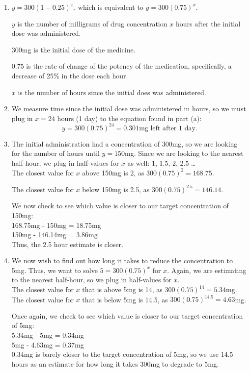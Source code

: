 \documentclass{ximera}
\begin{document}
\begin{explanation}
\begin{enumerate}
\item $y = 300(1-0.25)^x$, which is equivalent to $y = 300(0.75)^x$.

$y$ is the number of milligrams of drug concentration $x$ hours after the initial dose was administered.

300mg is the initial dose of the medicine.

0.75 is the rate of change of the potency of the medication, specifically, a decrease of 25\% in the dose each hour.

$x$ is the number of hours since the initial does was administered.

\item We measure time since the initial dose was administered in hours, so we must plug in $x=24$ hours (1 day) to the equation found in part (a):
$$y = 300(0.75)^{24}=0.301 \text{mg left after 1 day.}$$

\item The initial administration had a concentration of 300mg, so we are looking for the number of hours until $y=150$mg. Since we are looking to the nearest half-hour, we plug in half-values for $x$ as well: 1, 1.5, 2, 2.5 \dots \\
The closest value for $x$ above 150mg is 2, as $300(0.75)^2 = 168.75$. 

The closest value for $x$ below 150mg is 2.5, as $300(0.75)^{2.5} = 146.14$.

We now check to see which value is closer to our target concentration of 150mg:\\
168.75mg - 150mg = 18.75mg \\
150mg - 146.14mg = 3.86mg \\
Thus, the 2.5 hour estimate is closer.

\item We now wish to find out how long it takes to reduce the concentration to 5mg. Thus, we want to solve $5 = 300(0.75)^x$ for $x$. Again, we are estimating to the nearest half-hour, so we plug in half-values for $x$.\\
The closest value for $x$ that is above 5mg is 14, as $300(0.75)^{14} = 5.34$mg.\\
The closest value for $x$ that is below 5mg is 14.5, as $300(0.75)^{14.5} = 4.63$mg.

Once again, we check to see which value is closer to our target concentration of 5mg:\\
5.34mg - 5mg = 0.34mg\\
5mg - 4.63mg = 0.37mg\\
0.34mg is barely closer to the target concentration of 5mg, so we use 14.5 hours as an estimate for how long it takes 300mg to degrade to 5mg.

\end{enumerate}
\end{explanation}
\end{document}
